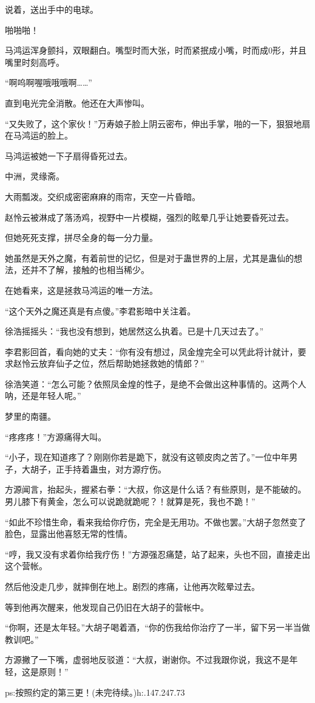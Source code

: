 \begin{this_body}
说着，送出手中的电球。

啪啪啪！

马鸿运浑身颤抖，双眼翻白。嘴型时而大张，时而紧抿成小嘴，时而成0形，并且嘴里时刻高呼。

“啊呜啊喔哦哦哦啊……”

直到电光完全消散。他还在大声惨叫。

“又失败了，这个家伙！”万寿娘子脸上阴云密布，伸出手掌，啪的一下，狠狠地扇在马鸿运的脸上。

马鸿运被她一下子扇得昏死过去。

中洲，灵缘斋。

大雨瓢泼。交织成密密麻麻的雨帘，天空一片昏暗。

赵怜云被淋成了落汤鸡，视野中一片模糊，强烈的眩晕几乎让她要昏死过去。

但她死死支撑，拼尽全身的每一分力量。

她虽然是天外之魔，有着前世的记忆，但是对于蛊世界的上层，尤其是蛊仙的想法，还并不了解，接触的也相当稀少。

在她看来，这是拯救马鸿运的唯一方法。

“这个天外之魔还真是有点傻。”李君影暗中关注着。

徐浩摇摇头：“我也没有想到，她居然这么执着。已是十几天过去了。”

李君影回首，看向她的丈夫：“你有没有想过，凤金煌完全可以凭此将计就计，要求赵怜云放弃仙子之位，然后帮助她拯救她的情郎？”

徐浩笑道：“怎么可能？依照凤金煌的性子，是绝不会做出这种事情的。这两个人呐，还是年轻人呢。”

梦里的南疆。

“疼疼疼！”方源痛得大叫。

“小子，现在知道疼了？刚刚你若是跪下，就没有这顿皮肉之苦了。”一位中年男子，大胡子，正手持着蛊虫，对方源疗伤。

方源闻言，抬起头，握紧右拳：“大叔，你这是什么话？有些原则，是不能破的。男儿膝下有黄金，怎么可以说跪就跪呢？！就算是死，我也不跪！”

“如此不珍惜生命，看来我给你疗伤，完全是无用功。不做也罢。”大胡子忽然变了脸色，显露出他喜怒无常的性情。

“哼，我又没有求着你给我疗伤！”方源强忍痛楚，站了起来，头也不回，直接走出这个营帐。

然后他没走几步，就摔倒在地上。剧烈的疼痛，让他再次眩晕过去。

等到他再次醒来，他发现自己仍旧在大胡子的营帐中。

“你啊，还是太年轻。”大胡子喝着酒，“你的伤我给你治疗了一半，留下另一半当做教训吧。”

方源撇了一下嘴，虚弱地反驳道：“大叔，谢谢你。不过我跟你说，我这不是年轻，这是原则！”

ps:按照约定的第三更！(未完待续。)h:.147.247.73

\end{this_body}

